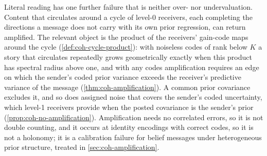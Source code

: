 Literal reading has one further failure that is neither over- nor undervaluation. Content that circulates around a cycle of level-0 receivers, each completing the directions a message does not carry with its own prior regression, can return amplified. The relevant object is the product of the receivers' gain-code maps around the cycle (\cref{def:coh-cycle-product}): with noiseless codes of rank below $K$ a story that circulates repeatedly grows geometrically exactly when this product has spectral radius above one, and with any codes amplification requires an edge on which the sender's coded prior variance exceeds the receiver's predictive variance of the message (\cref{thm:coh-amplification}). A common prior covariance excludes it, and so does assigned noise that covers the sender's coded uncertainty, which level-1 receivers provide when the posted covariance is the sender's prior (\cref{prop:coh-no-amplification}). Amplification needs no correlated errors, so it is not double counting, and it occurs at identity encodings with correct codes, so it is not a holonomy; it is a calibration failure for belief messages under heterogeneous prior structure, treated in \cref{sec:coh-amplification}.

